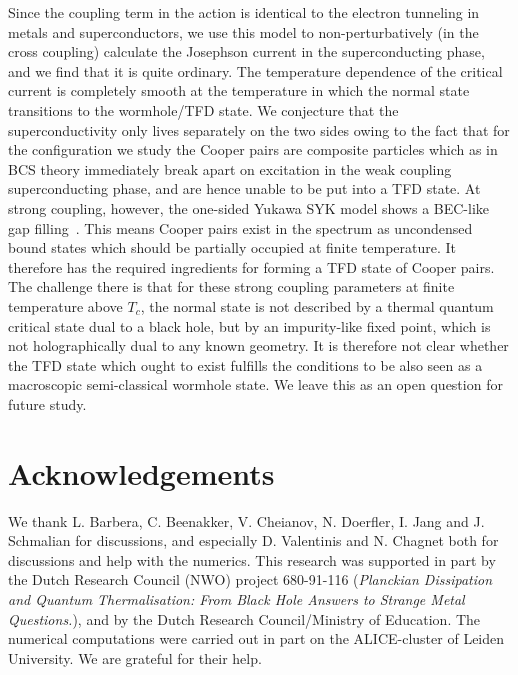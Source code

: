 Since the coupling term in the action is identical to the  electron tunneling in metals and superconductors, we use this model to non-perturbatively (in the cross coupling) calculate the Josephson current in the superconducting phase, and we find that it is quite ordinary. The temperature dependence of the critical current is completely smooth at the temperature in which the normal state transitions to the wormhole/TFD state. 
%
We conjecture that the superconductivity only lives separately on the two sides owing to the fact that for the configuration we study the Cooper pairs are composite particles which as in BCS theory immediately break apart on excitation in the weak coupling superconducting phase, and are hence unable to be put into a TFD state. At strong coupling, however, the one-sided Yukawa SYK model shows a BEC-like gap filling~\cite{esterlis2019cooper}. This means Cooper pairs exist  in the spectrum as uncondensed bound states which should be partially occupied at finite temperature. It therefore has the required ingredients for forming a TFD state of Cooper pairs. The challenge there is that for these strong coupling parameters at finite temperature above $T_c$, the normal state is not described by a thermal quantum critical state dual to a black hole, but by an impurity-like fixed point, which is not holographically dual to any known geometry. It is therefore not clear whether the TFD state which ought to exist fulfills the conditions to be also seen as a macroscopic semi-classical wormhole state. We leave this as an open question for future study.

\section*{Acknowledgements}
\noindent
We thank L. Barbera, C. Beenakker, V. Cheianov, N. Doerfler, I. Jang and J. Schmalian for discussions, and especially D. Valentinis and N. Chagnet both for discussions and help with the numerics. 
This research was supported in part by the Dutch Research Council (NWO) project 680-91-116 ({\em Planckian Dissipation and Quantum Thermalisation: From Black Hole Answers to Strange Metal Questions.}), and by the Dutch Research Council/Ministry of Education.
The numerical computations were carried out 
in part on the ALICE-cluster of Leiden
University. We are grateful for their help.

